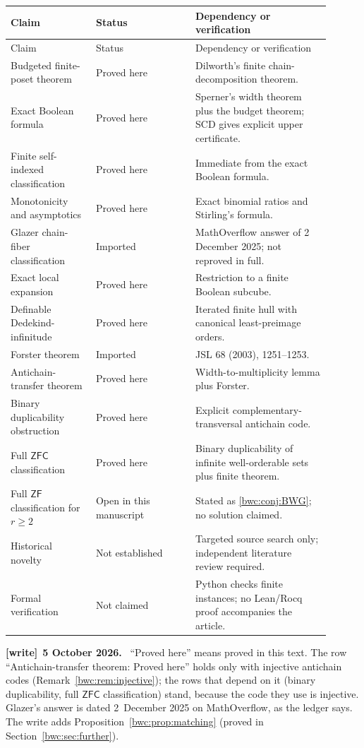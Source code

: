 \documentclass[11pt,letterpaper]{article}
\numberwithin{equation}{section}
\theoremstyle{plain}
\theoremstyle{definition}
\theoremstyle{remark}
\newcommand{\ZF}{\mathsf{ZF}}
\newcommand{\ZFC}{\mathsf{ZFC}}
\newenvironment{writenote}[1][]{\par\smallskip\begingroup\small
 \noindent\textbf{[write]}\if\relax\detokenize{#1}\relax\else~\textbf{#1.}\fi\ }%
 {\par\endgroup\smallskip}
\begin{document}
\begin{longtable}{L{0.24\linewidth}L{0.28\linewidth}L{0.38\linewidth}}
\toprule
Claim & Status & Dependency or verification\\
\midrule
\endfirsthead
\toprule
Claim & Status & Dependency or verification\\
\midrule
\endhead
Budgeted finite-poset theorem & Proved here & Dilworth's finite chain-decomposition theorem.\\
Exact Boolean formula & Proved here & Sperner's width theorem plus the budget theorem; SCD gives explicit upper certificate.\\
Finite self-indexed classification & Proved here & Immediate from the exact Boolean formula.\\
Monotonicity and asymptotics & Proved here & Exact binomial ratios and Stirling's formula.\\
Glazer chain-fiber classification & Imported & MathOverflow answer of 2 December 2025; not reproved in full.\\
Exact local expansion & Proved here & Restriction to a finite Boolean subcube.\\
Definable Dedekind-infinitude & Proved here & Iterated finite hull with canonical least-preimage orders.\\
Forster theorem & Imported & JSL 68 (2003), 1251--1253.\\
Antichain-transfer theorem & Proved here & Width-to-multiplicity lemma plus Forster.\\
Binary duplicability obstruction & Proved here & Explicit complementary-transversal antichain code.\\
Full $\ZFC$ classification & Proved here & Binary duplicability of infinite well-orderable sets plus finite theorem.\\
Full $\ZF$ classification for $r\geq2$ & Open in this manuscript & Stated as \cref{bwc:conj:BWG}; no solution claimed.\\
Historical novelty & Not established & Targeted source search only; independent literature review required.\\
Formal verification & Not claimed & Python checks finite instances; no Lean/Rocq proof accompanies the article.\\
\bottomrule
\end{longtable}

\begin{writenote}[5 October 2026]
``Proved here'' means proved in this text. The row ``Antichain-transfer
theorem: Proved here'' holds only with injective antichain codes
(Remark~\ref{bwc:rem:injective}); the rows that depend on it (binary
duplicability, full $\ZFC$ classification) stand, because the code they use
is injective. Glazer's answer is dated 2~December 2025 on MathOverflow, as the
ledger says. The write adds Proposition~\ref{bwc:prop:matching} (proved in
Section~\ref{bwc:sec:further}).
\end{writenote}
\end{document}
